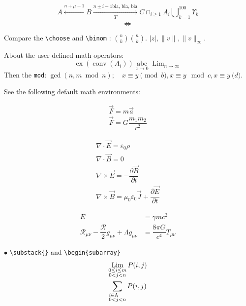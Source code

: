 \documentclass[12pt]{amsart}
\theoremstyle{plain}
\theoremstyle{definition}
\theoremstyle{remark}
\numberwithin{equation}{section} %
\newcommand{\calR}{\mathcal{R}}
\DeclareMathOperator*{\Lim}{Lim}
\DeclareMathOperator*{\intersect}{\cap}
\DeclareMathOperator*{\Union}{\bigcup}
\DeclareMathOperator{\ex}{ex}
\DeclareMathOperator{\co}{conv}
\providecommand{\abs}[1]{|#1|}
\providecommand{\norm}[2][]{\| #2 \|_{#1}}
\begin{document}
\begin{equation}\label{eq:arrow}
	A \xleftarrow{n+\mu-1} B \xrightarrow[T]{n\pm i-1 \text{bla, bla, bla}}	C \intersect_{i\geq 1} A_{i} \Union_{k=1}^{100}\Upsilon_{k}
\end{equation}
\[ \Leftarrow \mspace{-18.0mu} \Rightarrow \] %

Compare the \verb|\choose| and \verb|\binom| : $ {n \choose k} \binom{n}{k}$. $ \abs{z}, \norm{v}, \norm[\infty]{v} $.

About the user-defined math operators:
\[ \ex(\co(A_{i})) \operatorname*{abc}_{x\to 0} \Lim_{n\to \infty}\]
Then the \verb|mod|: $ \gcd(n,m\bmod n); \quad x \equiv y \pmod b, x \equiv y \mod c, x \equiv y \pod d $.

See the following default math environments:

\begin{multline}\label{eq:newton}
	\vec{F} = m\vec{a} \\
	\vec{F} = G \dfrac{m_{1}m_{2}}{r^{2}}
\end{multline}

\begin{subequations}\label{eq:maxwell}
	\begin{gather}
		\nabla\cdot \vec{E} = \varepsilon_{0}\rho \\
		\nabla \cdot \vec{B} = 0 \\
		\nabla \times \vec{E} = -\dfrac{\partial \vec{B}}{\partial t}\\
		\nabla \times \vec{B} = \mu_{0}\varepsilon_{0} \vec{J} + \dfrac{\partial \vec{E}}{\partial t}
	\end{gather}
\end{subequations}

\begin{equation}\label{eq:einstein}
	\begin{split}
		E& =\gamma mc^{2}
		\\
		\calR_{\mu\nu} - \dfrac{\calR}{2}g_{\mu\nu} + \Lambda g_{\mu\nu} & = \dfrac{8\pi G}{c^{4}} T_{\mu\nu}
	\end{split}
\end{equation}

$\bullet$ \verb|\substack{}| and \verb|\begin{subarray}|
\begin{gather}
	\Lim_{\substack{0\leq i \leq m\\ 0<j<n} } P(i,j)\\
	\sum_{\begin{subarray}{r}
			i\in \Lambda \\ 0<j<n
		\end{subarray}} P(i,j)
\end{gather}
\end{document}
